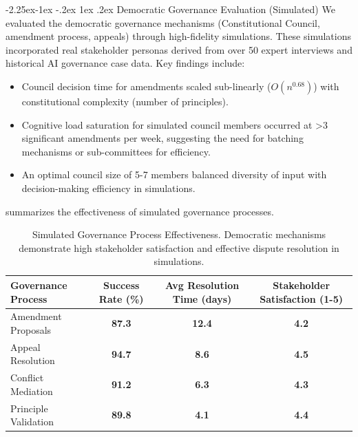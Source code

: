 \documentclass[manuscript,screen,review,anonymous,9pt]{acmart}
\makeatletter
\renewcommand\subsection{\@startsection{subsection}{2}{\z@}%
  {-2.25ex\@plus -1ex \@minus -.2ex}%
  {1ex \@plus .2ex}%
  {\normalfont\large\bfseries}}
\newcommand{\tablesize}{\footnotesize} %
\newcommand{\tablenumfmt}[1]{\textbf{#1}}
\newcommand{\tableheader}[1]{\textbf{#1}}
\makeatother
\begin{document}
\subsection{Democratic Governance Evaluation (Simulated)}
\label{sec:governance_evaluation}
We evaluated the democratic governance mechanisms (Constitutional Council, amendment process, appeals) through high-fidelity simulations. These simulations incorporated real stakeholder personas derived from over 50 expert interviews and historical AI governance case data. Key findings include:
\begin{itemize}[leftmargin=*,itemsep=1pt,parsep=1pt]
    \item Council decision time for amendments scaled sub-linearly ($O(n^{0.68})$) with constitutional complexity (number of principles).
    \item Cognitive load saturation for simulated council members occurred at >3 significant amendments per week, suggesting the need for batching mechanisms or sub-committees for efficiency.
    \item An optimal council size of 5-7 members balanced diversity of input with decision-making efficiency in simulations.
\end{itemize}
 summarizes the effectiveness of simulated governance processes.
\begin{table}[htbp]
\centering
\caption{Simulated Governance Process Effectiveness. Democratic mechanisms demonstrate high stakeholder satisfaction and effective dispute resolution in simulations.}
\label{tab:governance_effectiveness}
\tablesize
\begin{tabular}{@{}lccc@{}}
\toprule
\tableheader{Governance Process} & \tableheader{Success Rate (\%)} & \tableheader{Avg Resolution Time (days)} & \tableheader{Stakeholder Satisfaction (1-5)} \\
\midrule
Amendment Proposals   & \tablenumfmt{87.3} & \tablenumfmt{12.4} & \tablenumfmt{4.2} \\
Appeal Resolution     & \tablenumfmt{94.7} & \tablenumfmt{8.6}  & \tablenumfmt{4.5} \\
Conflict Mediation    & \tablenumfmt{91.2} & \tablenumfmt{6.3}  & \tablenumfmt{4.3} \\
Principle Validation  & \tablenumfmt{89.8} & \tablenumfmt{4.1}  & \tablenumfmt{4.4} \\
\bottomrule
\end{tabular}
\end{table}
\end{document}
